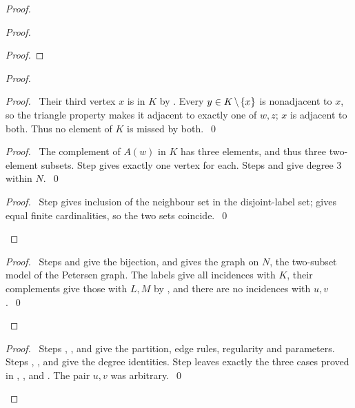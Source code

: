 \begin{proof}
\begin{proof}
\begin{proof}
  \end{proof}
  \begin{proof}
   \begin{proof}
    \pf\ Their third vertex $x$ is in $K$ by .
    Every $y\in K\mathbin{\mkern-1.5mu\setminus\mkern-1.5mu}\{x\}$ is
    nonadjacent to $x$, so the triangle property makes it adjacent to exactly one of
    $w,z$; $x$ is adjacent to both. Thus no element of $K$ is missed by both.~\qed
   \end{proof}
   \begin{proof}
    \pf\ The complement of $A(w)$ in $K$ has three elements, and thus three two-element
    subsets. Step  gives exactly one vertex for each.
    Steps  and  give degree 3 within $N$.~\qed
   \end{proof}
   \qedstep
   \begin{proof}
    \pf\ Step  gives inclusion of the neighbour set in the
    disjoint-label set;  gives equal finite cardinalities,
    so the two sets coincide.~\qed
   \end{proof}
  \end{proof}
  \qedstep
  \begin{proof}
   \pf\ Steps  and  give the bijection,
   and  gives the graph on $N$, the two-subset model of the Petersen
   graph. The labels give all incidences with $K$, their complements give those with
   $L,M$ by , and there are no incidences with $u,v$.~\qed
  \end{proof}
 \end{proof}

 \qedstep
 \begin{proof}
  \pf\ Steps , , and 
  give the partition, edge rules, regularity and parameters.
  Steps , , and 
  give the degree identities. Step  leaves exactly the three cases
  proved in , , and .
  The pair $u,v$ was arbitrary.~\qed
 \end{proof}
\end{proof}

